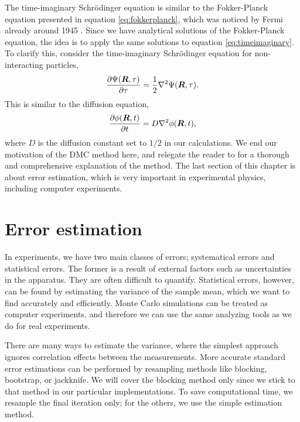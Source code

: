 The time-imaginary Schrödinger equation is similar to the Fokker-Planck equation presented in equation \eqref{eq:fokkerplanck}, which was noticed by Fermi already around 1945 \supercite{metropolis_monte_1949,ceperley_quantum_1986}. Since we have analytical solutions of the Fokker-Planck equation, the idea is to apply the same solutions to equation \eqref{eq:timeimaginary}. To clarify this, consider the time-imaginary Schrödinger equation for non-interacting particles,
\begin{equation}
\frac{\partial\Psi(\boldsymbol{{R}},\tau)}{\partial\tau}=\frac{1}{2}\nabla^2\Psi(\boldsymbol{{R}},\tau).
\end{equation}
This is similar to the diffusion equation,
\begin{equation}
\frac{\partial\phi(\boldsymbol{{R}},t)}{\partial t}=D\nabla^2\phi(\boldsymbol{{R}},t),
\end{equation}
where $D$ is the diffusion constant set to $1/2$ in our calculations. We end our motivation of the DMC method here, and relegate the reader to \citet{kosztin_introduction_1996} for a thorough and comprehensive explanation of the method. The last section of this chapter is about error estimation, which is very important in experimental physics, including computer experiments. 

\section{Error estimation} \label{sec:variance}
In experiments, we have two main classes of errors; systematical errors and statistical errors. The former is a result of external factors such as uncertainties in the apparatus. They are often difficult to quantify. Statistical errors, however, can be found by estimating the variance of the sample mean, which we want to find accurately and efficiently. Monte Carlo simulations can be treated as computer experiments, and therefore we can use the same analyzing tools as we do for real experiments.

There are many ways to estimate the variance, where the simplest approach ignores correlation effects between the measurements. More accurate standard error estimations can be performed by resampling methods like blocking\supercite{flyvbjerg_error_1989}, bootstrap\supercite{efron_bootstrap_1979}, or jackknife\supercite{quenouille_problems_1949}. We will cover the blocking method only since we stick to that method in our particular implementations. To save computational time, we resample the final iteration only; for the others, we use the simple estimation method.

